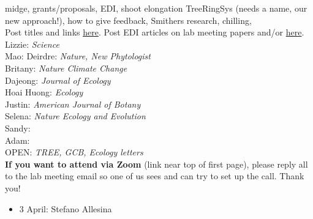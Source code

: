 \documentclass[11pt]{article}
\newenvironment{smitemize}{
\begin{itemize}
  \setlength{\itemsep}{0pt}
  \setlength{\parskip}{0.8pt}
  \setlength{\parsep}{0pt}}
{\end{itemize}
}
\begin{document}
\vspace{6pt}
 midge, grants/proposals, EDI, shoot elongation TreeRingSys (needs a name, our new approach!), how to give feedback, Smithers research, chilling, \\
\vspace{7pt}
 Post titles and links \href{https://docs.google.com/document/d/1j0WdDbjdp8ERLSO7whvtnP-tOblYMlX33TSCXy_uRKo/edit?usp=sharing}{\underline{here}}. Post EDI articles on lab meeting papers and/or  \href{https://docs.google.com/document/d/18VbP-03oD0BsArxYm60g1ZvvFL7IoA3-6rpdHb1eLPw/edit#heading=h.gsqcglkhxkzg}{here}.\\

Lizzie: \emph{Science}\\
Mao:
Deirdre: \emph{Nature, New Phytologist}\\
Britany: \emph{Nature Climate Change}\\
Dajeong: \emph{Journal of Ecology}\\
Hoai Huong: \emph{Ecology}\\
Justin: \emph{American Journal of Botany}\\
Selena: \emph{Nature Ecology and Evolution}\\
Sandy:\\
Adam:\\

OPEN: \emph{TREE, GCB, Ecology letters}\\

{\bf If you want to attend via Zoom} (link near top of first page), please reply all to the lab meeting email so one of us sees and can try to set up the call. Thank you!

\vspace{6pt}
\vspace{-1ex}
\begin{smitemize}
\item 3 April: Stefano Allesina
\end{smitemize}
\end{document}
